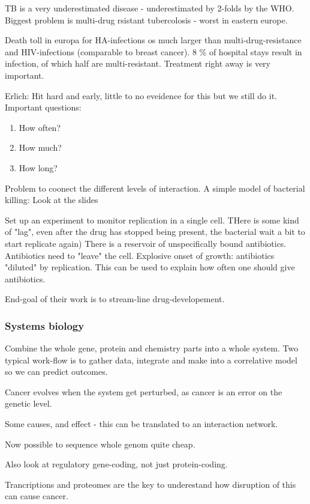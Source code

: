 \documentclass[12p]{article}
\begin{document}
TB is a very underestimated disease - underestimated by 2-folds by the WHO.
Biggest problem is multi-drug rsistant tubercolosis - worst in eastern europe. 

Death toll in europa for HA-infections os much larger than multi-drug-resistance and HIV-infections (comparable to breast cancer).
8 \% of hospital stays result in infection, of which half are multi-resistant.
Treatment right away is very important.

Erlich: Hit hard and early, little to no eveidence for this but we still do it.
Important questions: 

\begin{enumerate}
    \item
	How often?
    \item
	How much?
    \item
	How long?
\end{enumerate}

Problem to coonect the different levels of interaction.
A simple model of bacterial killing: Look at the slides

Set up an experiment to monitor replication in a single cell.
THere is some kind of "lag", even after the drug has stopped being present, the bacterial wait a bit to start replicate again)
There is a reservoir of unspecifically bound antibiotics.
Antibiotics need to "leave" the cell.
Explosive onset of growth: antibiotics "diluted" by replication.
This can be used to explain how often one should give antibiotics.

End-goal of their work is to stream-line drug-developement.

\subsubsection{Systems biology}

Combine the whole gene, protein and chemistry parts into a whole system.
Two typical work-flow is to gather data, integrate and make into a correlative model so we can predict outcomes.

Cancer evolves when the system get perturbed, as cancer is an error on the genetic level.

Some causes, and effect - this can be translated to an interaction network.

Now possible to sequence whole genom quite cheap.

Also look at regulatory gene-coding, not just protein-coding.

Trancriptions and proteomes are the key to underestand how disruption of this can cause cancer.
\end{document}
